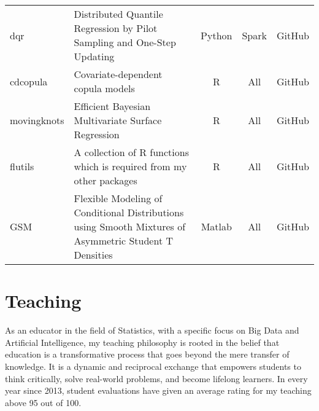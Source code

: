 \documentclass[twoside,a4paper]{article}
\begin{document}
\begin{center}
\begin{tabular}{lp{9cm}ccl}
dqr         & Distributed Quantile Regression by Pilot Sampling and One-Step Updating                                                                                & Python   & Spark       & GitHub       \\
cdcopula    & Covariate-dependent copula models                                                                                                                      & R        & All         & GitHub       \\
movingknots & Efficient Bayesian Multivariate Surface Regression                                                                                                     & R        & All         & GitHub       \\
flutils     & A collection of R functions which is required from my other packages                                                                                   & R        & All         & GitHub       \\
GSM         & Flexible Modeling of Conditional Distributions using Smooth Mixtures of Asymmetric Student T Densities                                                 & Matlab   & All         & GitHub       \\
  \bottomrule
\end{tabular}
\end{center}

\newpage
\section{Teaching}

\indent As an educator in the field of Statistics, with a specific focus on Big Data and Artificial Intelligence, my teaching philosophy is rooted in the belief that education is a transformative process that goes beyond the mere transfer of knowledge. It is a dynamic and reciprocal exchange that empowers students to think critically, solve real-world problems, and become lifelong learners. In every year since 2013, student evaluations have given an average rating for my teaching above 95 out of 100.
\end{document}
